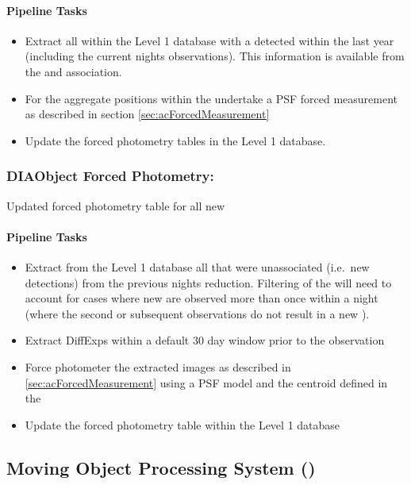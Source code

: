 \paragraph{Pipeline Tasks}

\begin{itemize}
\item Extract all \DIAObjects within the Level 1 database with a detected \DIASource within the last year (including the current nights observations). This information is available from the \DIASource and \DIAObject association.
\item For the aggregate positions within the \DIAObject undertake a PSF forced measurement as described in section \ref{sec:acForcedMeasurement}
\item Update the forced photometry tables in the Level 1 database.
\end{itemize}



\subsubsection{DIAObject Forced Photometry:}

Updated forced photometry table for all new \DIAObjects


\paragraph{Pipeline Tasks}

\begin{itemize}
\item Extract from the Level 1 database all \DIAObjects that were unassociated (i.e.\ new \DIASource detections) from the previous nights reduction. Filtering of the \DIAObjects will need to account for cases where new \DIASources are observed more than once within a night (where the second or subsequent observations do not result in a new \DIAObject).
\item Extract DiffExps within a  default 30 day window prior to the observation
\item Force photometer the extracted images as described in \ref{sec:acForcedMeasurement} using a PSF model and the centroid defined in the \DIAObject
\item Update the forced photometry table within the Level 1 database
\end{itemize}
\clearpage



\subsection{Moving Object Processing System (\wbsMOPS)}
\label{sec:apMovingObjectPipeline}

